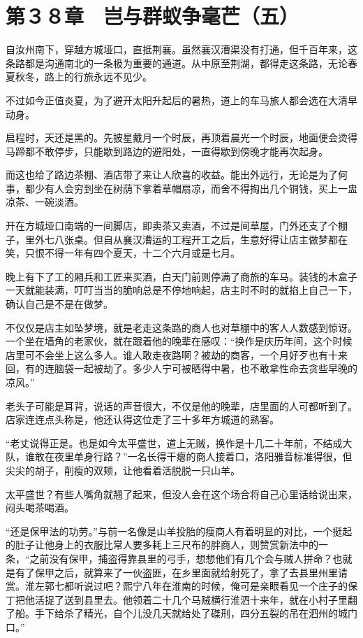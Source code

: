 \section{第３８章　岂与群蚁争毫芒（五）}

自汝州南下，穿越方城垭口，直抵荆襄。虽然襄汉漕渠没有打通，但千百年来，这条路都是沟通南北的一条极为重要的通道。从中原至荆湖，都得走这条路，无论春夏秋冬，路上的行旅永远不见少。

不过如今正值炎夏，为了避开太阳升起后的暑热，道上的车马旅人都会选在大清早动身。

启程时，天还是黑的。先披星戴月一个时辰，再顶着晨光一个时辰，地面便会烫得马蹄都不敢停步，只能歇到路边的避阳处，一直得歇到傍晚才能再次起身。

而这也给了路边茶棚、酒店带了来让人欣喜的收益。能出外远行，无论是为了何事，都少有人会穷到坐在树荫下拿着草帽扇凉，而舍不得掏出几个铜钱，买上一盅凉茶、一碗淡酒。

开在方城垭口南端的一间脚店，即卖茶又卖酒，不过是间草屋，门外还支了个棚子，里外七八张桌。但自从襄汉漕运的工程开工之后，生意好得让店主做梦都在笑，只恨不得一年有四个夏天，十二个六月或是七月。

晚上有下了工的厢兵和工匠来买酒，白天门前则停满了商旅的车马。装钱的木盒子一天就能装满，叮叮当当的脆响总是不停地响起，店主时不时的就掐上自己一下，确认自己是不是在做梦。

不仅仅是店主如坠梦境，就是老走这条路的商人也对草棚中的客人人数感到惊讶。一个坐在墙角的老家伙，就在跟着他的晚辈在感叹：“换作是庆历年间，这个时候店里可不会坐上这么多人。谁人敢走夜路啊？被劫的商客，一个月好歹也有十来回，有的连脑袋一起被劫了。多少人宁可被晒得中暑，也不敢拿性命去贪些早晚的凉风。”

老头子可能是耳背，说话的声音很大，不仅是他的晚辈，店里面的人可都听到了。店家连连点头称是，他还认得这位走了三十多年方城道的熟客。

“老丈说得正是。也是如今太平盛世，道上无贼，换作是十几二十年前，不结成大队，谁敢在夜里单身行路？”一名长得干瘪的商人接着口，洛阳雅音标准得很，但尖尖的胡子，削瘦的双颊，让他看着活脱脱一只山羊。

太平盛世？有些人嘴角就翘了起来，但没人会在这个场合将自己心里话给说出来，闷头喝茶喝酒。

“还是保甲法的功劳。”与前一名像是山羊投胎的瘦商人有着明显的对比，一个挺起的肚子让他身上的衣服比常人要多耗上三尺布的胖商人，则赞赏新法中的一条，“之前没有保甲，捕盗得靠县里的弓手，想想他们有几个会与贼人拼命？也就是有了保甲之后，就算来了一伙盗匪，在乡里面就给射死了，拿了去县里州里请赏。淮左郭七都听说过吧？熙宁八年在淮南的时候，俺可是亲眼看见一个庄子的保丁把他活捉了送到县里去。他领着二十几个马贼横行淮泗十来年，就在小村子里翻了船。手下给杀了精光，自个儿没几天就给处了磔刑，四分五裂的吊在泗州的城门口。”

